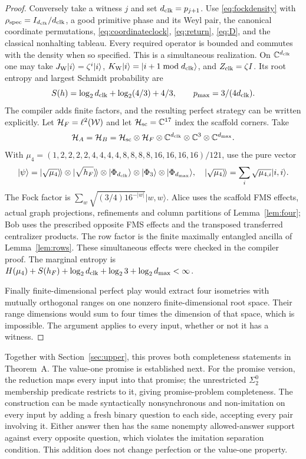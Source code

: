 \begin{proof}
Conversely take a witness $j$ and set ${d_{\rm clk}}=p_{j+1}$. Use \eqref{eq:fockdensity} with $\rho_{\rm spec}=I_{d_{\rm clk}}/{d_{\rm clk}}$, a good primitive phase and its Weyl pair, the canonical coordinate permutations, \eqref{eq:coordinateclock}, \eqref{eq:return}, \eqref{eq:D}, and the classical nonhalting tableau. Every required operator is bounded and commutes with the density when so specified. This is a simultaneous realization. On $\mathbb C^{d_{\rm clk}}$ one may take $J_{\rm W}|i\rangle=\zeta^i|i\rangle$, $K_{\rm W}|i\rangle=|i+1\bmod {d_{\rm clk}}\rangle$, and $Z_{\rm clk}=\zeta I$. Its root entropy and largest Schmidt probability are
\begin{equation}\label{eq:witnessentropy}
 S(h)=\log_2{d_{\rm clk}}+\log_2(4/3)+4/3,\qquad p_{\max}=3/(4{d_{\rm clk}}).
\end{equation}
The compiler adds finite factors, and the resulting perfect strategy can be written explicitly. Let $\mathcal H_F=\ell^2(\mathcal W)$ and let $\mathcal H_{\rm sc}=\mathbb C^{17}$ index the scaffold corners. Take
\[
 \mathcal H_A=\mathcal H_B=
 \mathcal H_{\rm sc}\otimes\mathcal H_F\otimes\mathbb C^{d_{\rm clk}}
 \otimes\mathbb C^3\otimes\mathbb C^{d_{\max}}.
\]
With $\mu_4=(1,2,2,2,2,4,4,4,4,8,8,8,8,16,16,16,16)/121$, use the pure vector
\[
 |\psi\rangle=|\sqrt{\mu_4}\rangle\!\rangle\otimes
 |\sqrt{h_F}\rangle\!\rangle\otimes|\Phi_{d_{\rm clk}}\rangle
 \otimes|\Phi_3\rangle\otimes|\Phi_{d_{\max}}\rangle,
 \quad |\sqrt{\mu_4}\rangle\!\rangle=\sum_i\sqrt{\mu_{4,i}}|i,i\rangle.
\]
The Fock factor is $\sum_w\sqrt{(3/4)16^{-|w|}}|w,w\rangle$. Alice uses the scaffold FMS effects, actual graph projections, refinements and column partitions of Lemma~\ref{lem:four}; Bob uses the prescribed opposite FMS effects and the transposed transferred centralizer products. The row factor is the finite maximally entangled ancilla of Lemma~\ref{lem:rows}. These simultaneous effects were checked in the compiler proof. The marginal entropy is $H(\mu_4)+S(h_F)+\log_2{d_{\rm clk}}+\log_2 3+\log_2d_{\max}<\infty$.

Finally finite-dimensional perfect play would extract four isometries with mutually orthogonal ranges on one nonzero finite-dimensional root space. Their range dimensions would sum to four times the dimension of that space, which is impossible. The argument applies to every input, whether or not it has a witness.
\end{proof}

Together with Section~\ref{sec:upper}, this proves both completeness statements in Theorem~A. The value-one promise is established next. For the promise version, the reduction maps every input into that promise; the unrestricted $\Sigma^0_2$ membership predicate restricts to it, giving promise-problem completeness. The construction can be made syntactically nonsynchronous and non-imitation on every input by adding a fresh binary question to each side, accepting every pair involving it. Either answer then has the same nonempty allowed-answer support against every opposite question, which violates the imitation separation condition. This addition does not change perfection or the value-one property.

